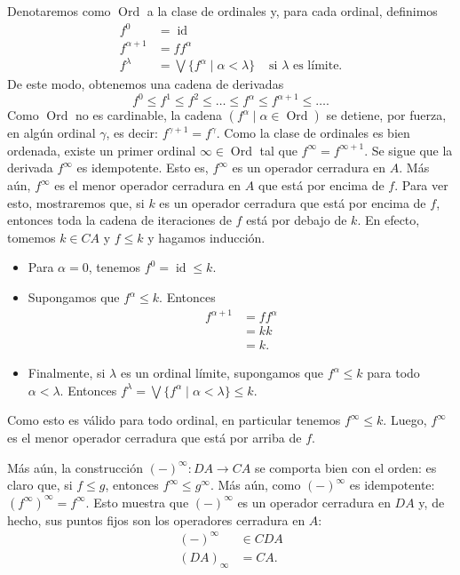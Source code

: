 \documentclass[12pt,letterpaper,titlepage]{article}
\theoremstyle{definition}
\newcommand\Sup{\bigvee}
\newcommand\<{\langle}
\renewcommand\>{\rangle}
\DeclareMathOperator{\Ord}{Ord}
\DeclareMathOperator{\id}{id}
\begin{document}
Denotaremos como $\Ord$ a la clase de ordinales y, para cada
ordinal, definimos
\begin{align*}
  f^0 &= \id \\
  f^{\alpha+1} &= ff^\alpha \\
  f^\lambda &= \Sup\{f^\alpha \mid \alpha<\lambda\}
    & \text{ si $\lambda$ es límite.}
\end{align*}
De este modo, obtenemos una cadena de derivadas
\[
  f^0\leq f^1\leq f^2\leq\dots\leq f^\alpha\leq f^{\alpha+1}
  \leq\dots
.\]
Como $\Ord$ no es cardinable, la cadena
$(f^\alpha \mid \alpha\in \Ord )$ se detiene, por fuerza, en
algún ordinal $\gamma$, es decir: $f^{\gamma+1}=f^\gamma$.
Como la clase de ordinales es bien ordenada, existe un primer
ordinal $\infty\in\Ord$ tal que $f^\infty=f^{\infty+1}$.
Se sigue que la derivada $f^\infty$ es idempotente.
Esto es, $f^\infty$ es un operador cerradura en $A$.
Más aún, $f^\infty$ es el menor operador cerradura en $A$
que está por encima de $f$.
Para ver esto, mostraremos que, si $k$ es un operador cerradura
que está por encima de $f$, entonces toda la cadena de iteraciones
de $f$ está por debajo de $k$.
En efecto, tomemos $k\in CA$ y $f\leq k$ y hagamos inducción.
\begin{itemize}
  \item Para $\alpha=0$, tenemos $f^0=\id\leq k$.
  \item Supongamos que $f^\alpha\leq k$.
  Entonces
  \begin{align*}
    f^{\alpha+1}
    &= ff^\alpha \\
    &= kk \\
    &= k.
  \end{align*}
  \item Finalmente, si $\lambda$ es un ordinal límite, supongamos
  que $f^\alpha\leq k$ para todo $\alpha<\lambda$.
  Entonces
  $f^\lambda=\Sup\{f^\alpha\mid \alpha<\lambda\}\leq k$.
\end{itemize}
Como esto es válido para todo ordinal, en particular tenemos
$f^\infty\leq k$.
Luego, $f^\infty$ es el menor operador cerradura que está por
arriba de $f$.

Más aún, la construcción $({-})^\infty:DA\to CA$ se comporta bien
con el orden:
es claro que, si $f\leq g$, entonces $f^\infty\leq g^\infty$.
Más aún, como $({-})^\infty$ es idempotente:
$(f^\infty)^\infty=f^\infty$.
Esto muestra que $({-})^\infty$ es un operador cerradura en $DA$
y, de hecho, sus puntos fijos son los
operadores cerradura en $A$:
\begin{align*}
  ({-})^\infty &\in CDA \\
  (DA)_\infty &= CA.
\end{align*}
\end{document}
